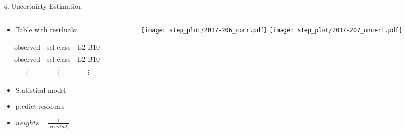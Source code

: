 \begin{frame}[t]{4. Uncertainty Estimation}
    \begin{columns}
        \begin{column}{0.45\textwidth}
            \begin{itemize}
                \item Table with residuals:
            \end{itemize}

            \scriptsize
            \begin{tabular}{| c |  c c c c |}
                \hline
                \color{myred}{residuals}    & observed & scl-class & B2-B10   & \color{mygray}{weather}  \\
                \color{myred}{residuals}    & observed & scl-class & B2-B10   & \color{mygray}{weather}  \\
                \color{myred}{$\vdots$    } & $\vdots$ & $\vdots$  & $\vdots$ & \color{mygray}{$\vdots$} \\
            \end{tabular}\normalsize \vspace{0.5cm}

            \begin{itemize}
                \item Statistical model
                \item predict residuals
                \item $weights = \frac{1}{|residual|}$
            \end{itemize}
        \end{column}
        \begin{column}{0.42\textwidth}
            \begin{figure}
                \vspace{-1.8cm}
                \texttt{[image: step\_plot/2017-206\_corr.pdf]}
                \texttt{[image: step\_plot/2017-207\_uncert.pdf]}
            \end{figure}
        \end{column}
    \end{columns}
\end{frame}


